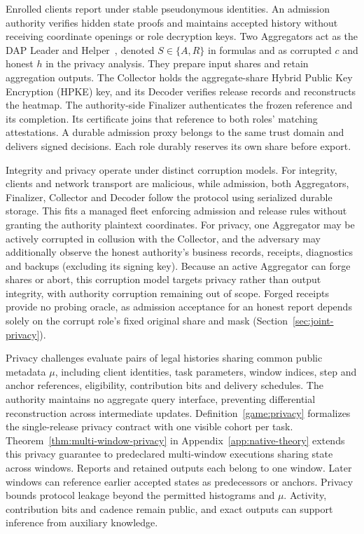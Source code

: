 \documentclass[conference,compsoc]{IEEEtran}
\theoremstyle{definition}
\numberwithin{equation}{section}
\numberwithin{table}{section}
\numberwithin{figure}{section}
\theoremstyle{plain}
\begin{document}
Enrolled clients report under stable pseudonymous identities. An admission
authority verifies hidden state proofs and maintains accepted history without
receiving coordinate openings or role decryption keys. Two Aggregators act
as the DAP Leader and Helper~\cite{Geoghegan2026DAP}, denoted \(S\in\{A,R\}\)
in formulas and as corrupted \(c\) and honest \(h\) in the privacy analysis. They
prepare input shares and retain aggregation outputs. The Collector holds the aggregate-share
Hybrid Public Key Encryption (HPKE) key, and its Decoder verifies release records and reconstructs the heatmap. The
authority-side Finalizer authenticates the frozen reference and its completion.
Its certificate joins that reference to both roles' matching attestations. A durable admission proxy
belongs to the same trust domain and delivers signed decisions. Each role
durably reserves its own share before export.

Integrity and privacy operate under distinct corruption models. For integrity, clients
and network transport are malicious, while admission, both Aggregators, Finalizer,
Collector and Decoder follow the protocol using serialized durable storage. This fits a managed fleet
enforcing admission and release rules without granting the authority plaintext coordinates.
For privacy, one Aggregator may be actively corrupted in collusion with the
Collector, and the adversary may additionally observe the honest authority's business records,
receipts, diagnostics and backups (excluding its signing key).
Because an active Aggregator can forge shares or abort, this corruption model targets
privacy rather than output integrity, with authority corruption remaining out of scope.
Forged receipts provide no probing oracle, as admission acceptance for
an honest report depends solely on the corrupt role's fixed original share and mask
(Section~\ref{sec:joint-privacy}).

Privacy challenges evaluate pairs of legal histories sharing common public metadata \(\mu\),
including client identities, task parameters, window indices, step and anchor references,
eligibility, contribution bits and delivery schedules. The authority maintains no aggregate query
interface, preventing differential reconstruction across intermediate updates. Definition~\ref{game:privacy}
formalizes the single-release privacy contract with one visible cohort per task. Theorem~\ref{thm:multi-window-privacy}
in Appendix~\ref{app:native-theory} extends this privacy guarantee to predeclared multi-window executions sharing state across windows.
Reports and retained outputs each belong to one window. Later windows can
reference earlier accepted states as predecessors or anchors.
Privacy bounds protocol leakage beyond the permitted histograms and \(\mu\).
Activity, contribution bits and cadence remain public, and exact outputs
can support inference from auxiliary knowledge.
\end{document}

